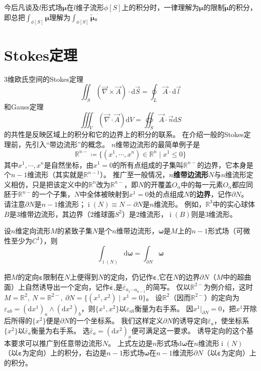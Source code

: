 今后凡谈及$l$形式场$\bm\mu$在$l$维子流形$\phi[S]$上的积分时，一律理解为$\bm\mu$的限制$\bm{\tilde\mu}$的积分，即总把$\displaystyle\int_{\phi[S]}\bm\mu$理解为$\displaystyle\int_{\phi[S]}\bm{\tilde\mu}$。

\section{Stokes定理}

$3$维欧氏空间的Stokes定理
$$\iint_S(\vec\nabla \times \vec{A})\cdot\mathrm{d}\vec{S} = \oint_L\vec{A}\cdot\mathrm{d}\vec{l}$$
和Gauss定理
$$\iiint_V(\vec\nabla\cdot\vec{A})\mathrm{d}V = \oiint_S\vec{A}\cdot\vec{n}\mathrm{d}S$$
的共性是反映区域上的积分和它的边界上的积分的联系。
在介绍一般的Stokes定理前，先引入``带边流形''的概念。
$n$维带边流形的最简单例子是
$$\mathbb{R}^{n-} \coloneq \{(x^1, \cdots, x^n) \in \mathbb{R}^n \mid x^1 \leq 0\}$$
其中$x^1, \cdots, x^n$是自然坐标，由$x^1 = 0$的所有点组成的子集叫$\mathbb{R}^{n-}$的边界，它本身是个$n - 1$维流形（其实就是$\mathbb{R}^{n - 1}$）。
推广至一般情况，\textbf{$n$维带边流形}$N$与$n$维流形定义相仿，只是把该定义中的$\mathbb{R}^n$改为$\mathbb{R}^{n-}$，即$N$的开覆盖${O_\alpha}$中的每一元素$O_\alpha$都应同胚于$\mathbb{R}^{n-}$的一个子集，$N$中全体被映射到$x^1 = 0$处的点组成$N$的\textbf{边界}，记作$\partial N$。
请注意$\partial N$是$n - 1$维流形；$\operatorname{i}(N) \equiv N - \partial N$是$n$维流形。
例如，$\mathbb{R}^3$中的实心球体$B$是$3$维带边流形，其边界（$2$维球面$S^2$）是$2$维流形，$\operatorname{i}(B)$则是$3$维流形。

\begin{theorem}
    设$n$维定向流形$M$的紧致子集$N$是个$n$维带边流形，$\bm\omega$是$M$上的$n - 1$形式场（可微性至少为$C^1$），则
    $$\int_{\operatorname{i}(N)}\mathrm{d}\bm\omega = \int_{\partial N}\bm\omega$$
\end{theorem}

\begin{note}
    把$M$的定向$\bm\varepsilon$限制在$N$上便得到$N$的定向，仍记作$\bm\varepsilon$,它在$N$的边界$\partial N$（$M$中的超曲面）上自然诱导出一个定向，记作$\bm{\bar\varepsilon}$,是$\bar\varepsilon_{a_1 \cdots a_{n - 1}}$的简写。
    仅以$\mathbb{R}^{2-}$为例介绍，这时$M = \mathbb{R}^2, ~ N = \mathbb{R}^{2-}, ~ \partial N = \{(x^1, x^2) \mid x^1 = 0\}$。
    设$\mathbb{R}^2$（因而$\mathbb{R}^{2-}$）的定向为$\varepsilon_{ab} = (\mathrm{d}x^1)_a \wedge (\mathrm{d}x^2)_b$，则$\{x^1, x^2\}$以$\varepsilon_{ab}$衡量为右手系。
    因$x^1|_{\partial N} = 0$，把$x^1$开除后所得的$\{x^2\}$便是$\partial N$的一个坐标系。
    我们这样定义$\partial N$的诱导定向$\bar\varepsilon_a$，使坐标系$\{x^2\}$以$\bar\varepsilon_a$衡量为右手系。
    选$\bar\varepsilon_a = (\mathrm{d}x^2)_a$便可满足这一要求。
    诱导定向的这个基本要求可以推广到任意带边流形$N$。
    上式左边是$n$形式场$\mathrm{d}\bm\omega$在$n$维流形$\operatorname{i}(N)$（以$\bm\varepsilon$为定向）上的积分，右边是$n - 1$形式场$\bm\omega$在$n - 1$维流形$\partial N$（以$\bm{\bar\varepsilon}$为定向）上的积分。
\end{note}

